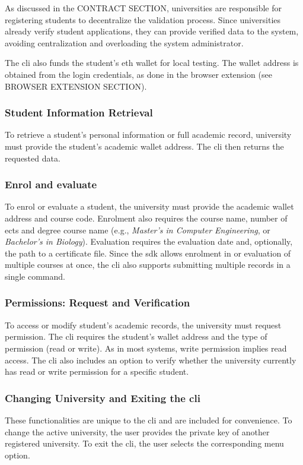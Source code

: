 As discussed in the CONTRACT SECTION, universities are responsible for registering students to decentralize the validation process. Since universities already verify student applications, they can provide verified data to the system, avoiding centralization and overloading the system administrator.

The \acrshort{cli} also funds the student's \acrlong{eth} wallet  for local testing. The wallet address is obtained from the login credentials, as done in the browser extension (see BROWSER EXTENSION SECTION).

\subsubsection{Student Information Retrieval}
To retrieve a student's personal information or full academic record, university must provide the student's academic wallet address. The \acrshort{cli} then returns the requested data.

\subsubsection{Enrol and evaluate}
To enrol or evaluate a student, the university must provide the academic wallet address and course code. Enrolment also requires the course name, number of \acrshort{ects} and degree course name (e.g., \textit{Master's in Computer Engineering}, or \textit{Bachelor's in Biology}). Evaluation requires the evaluation date and, optionally, the path to a certificate file. Since the \acrshort{sdk} allows enrolment in or evaluation of multiple courses at once, the \acrshort{cli} also supports submitting multiple records in a single command.     

\subsubsection{Permissions: Request and Verification}
To access or modify student's academic records, the university must request permission. The \acrshort{cli} requires the student's wallet address and the type of permission (read or write). As in most systems, write permission implies read access.
The \acrshort{cli} also includes an option to verify whether the university currently has read or write permission for a specific student.

\subsubsection{Changing University and Exiting the \acrshort{cli}}
These functionalities are unique to the \acrshort{cli} and are included for convenience. To change the active university, the user provides the private key of another registered university. To exit the \acrshort{cli}, the user selects the corresponding menu option.

